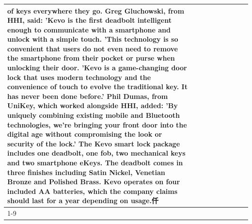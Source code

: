 \begin{table}[H]
\begin{tabular}{lllrlllll}
of keys everywhere they go. Greg Gluchowski, from HHI, said: 'Kevo is the first deadbolt intelligent enough to communicate with a smartphone and unlock with a simple touch. 'This technology is so convenient that users do not even need to remove the smartphone from their pocket or purse when unlocking their door. 'Kevo is a game-changing door lock that uses modern technology and the convenience of touch to evolve the traditional key. It has never been done before.' Phil Dumas, from UniKey, which worked alongside HHI, added: 'By uniquely combining existing mobile and Bluetooth technologies, we’re bringing your front door into the digital age without compromising the look or security of the lock.' The Kevo smart lock package includes one deadbolt, one fob, two mechanical keys and two smartphone eKeys. The deadbolt comes in three finishes including Satin Nickel, Venetian Bronze and Polished Brass. Kevo operates on four included AA batteries, which the company claims should last for a year depending on usage.仟 \\
\cline{1-9}

\end{tabular}
\end{table}

